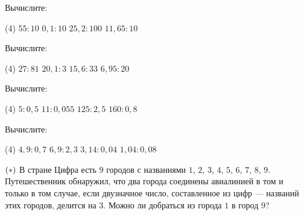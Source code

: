 \begin{homework}[number=2]
	\begin{listofex}
		\item Вычислите:
	\begin{tasks}(4)
		\task \( 55:10 \) 
		\task \( 0,1:10 \)
		\task \( 25,2:100 \)
		\task \( 11,65:10 \)
	\end{tasks}
		\item Вычислите:
		\begin{tasks}(4)
			\task \( 27:81 \)
			\task \( 20,1:3 \)
			\task \( 15,6:33 \)
			\task \( 6,95:20 \)
		\end{tasks}
		\item Вычислите:
		\begin{tasks}(4)
			\task \( 5:0,5 \) 
			\task \( 11:0,055 \)
			\task \( 125:2,5 \)
			\task \( 160:0,8 \)
		\end{tasks}
		\item Вычислите:
		\begin{tasks}(4)
			\task \( 4,9:0,7 \) 
			\task \( 6,9:2,3 \)
			\task \( 3,14:0,04 \)
			\task \( 1,04:0,08 \)
		\end{tasks}
		\item \( \left( {\LARGE *} \right) \) В стране Цифра есть \( 9 \) городов с названиями \( 1 \), \( 2 \), \( 3 \), \( 4 \), \( 5 \), \( 6 \), \( 7 \), \( 8 \), \( 9 \). Путешественник обнаружил, что два города соединены авиалинией в том и только в том случае, если двузначное число, составленное из цифр --- названий этих городов, делится на \( 3 \). Можно ли добраться из города \( 1 \) в город \( 9 \)?
		
	\end{listofex}
\end{homework}

